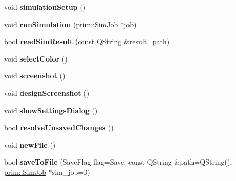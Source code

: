 \begin{DoxyCompactItemize}
\item 
void {\bfseries simulation\+Setup} ()\hypertarget{classgui_1_1ApplicationGUI_a7218a1d42666cef442b588c02793191a}{}\label{classgui_1_1ApplicationGUI_a7218a1d42666cef442b588c02793191a}

\item 
void {\bfseries run\+Simulation} (\hyperlink{classprim_1_1SimJob}{prim\+::\+Sim\+Job} $\ast$job)\hypertarget{classgui_1_1ApplicationGUI_aa8789f9fc4012eb41551826bba66dc3e}{}\label{classgui_1_1ApplicationGUI_aa8789f9fc4012eb41551826bba66dc3e}

\item 
bool {\bfseries read\+Sim\+Result} (const Q\+String \&result\+\_\+path)\hypertarget{classgui_1_1ApplicationGUI_ad81c4c8396d1673b92bcd8bcd4c85556}{}\label{classgui_1_1ApplicationGUI_ad81c4c8396d1673b92bcd8bcd4c85556}

\item 
void {\bfseries select\+Color} ()\hypertarget{classgui_1_1ApplicationGUI_ad2a295acee07b639d9b91a3809914d64}{}\label{classgui_1_1ApplicationGUI_ad2a295acee07b639d9b91a3809914d64}

\item 
void {\bfseries screenshot} ()\hypertarget{classgui_1_1ApplicationGUI_a5e25086665a4e1b5e4b53260dd275296}{}\label{classgui_1_1ApplicationGUI_a5e25086665a4e1b5e4b53260dd275296}

\item 
void {\bfseries design\+Screenshot} ()\hypertarget{classgui_1_1ApplicationGUI_a6b9cd8f04658f3cd4e2bf74961233364}{}\label{classgui_1_1ApplicationGUI_a6b9cd8f04658f3cd4e2bf74961233364}

\item 
void {\bfseries show\+Settings\+Dialog} ()\hypertarget{classgui_1_1ApplicationGUI_a1b66986bd5640a30a31ebcd49f6f0e0b}{}\label{classgui_1_1ApplicationGUI_a1b66986bd5640a30a31ebcd49f6f0e0b}

\item 
bool {\bfseries resolve\+Unsaved\+Changes} ()\hypertarget{classgui_1_1ApplicationGUI_ae52d505af539f8d6ae7cede1b27e884c}{}\label{classgui_1_1ApplicationGUI_ae52d505af539f8d6ae7cede1b27e884c}

\item 
void {\bfseries new\+File} ()\hypertarget{classgui_1_1ApplicationGUI_ae5d8d38378ee2ca8adfc17ab82548f90}{}\label{classgui_1_1ApplicationGUI_ae5d8d38378ee2ca8adfc17ab82548f90}

\item 
bool {\bfseries save\+To\+File} (Save\+Flag flag=Save, const Q\+String \&path=Q\+String(), \hyperlink{classprim_1_1SimJob}{prim\+::\+Sim\+Job} $\ast$sim\+\_\+job=0)\hypertarget{classgui_1_1ApplicationGUI_ae6da052182ac751e1d9ba58be16d9469}{}\label{classgui_1_1ApplicationGUI_ae6da052182ac751e1d9ba58be16d9469}


\end{DoxyCompactItemize}
